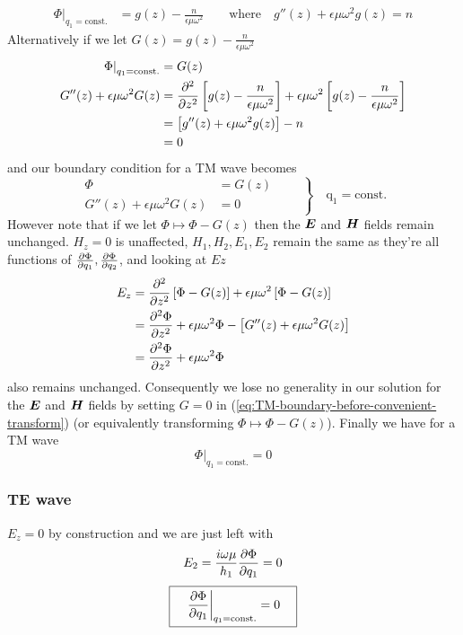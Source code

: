 \documentclass[twoside, a4paper]{article}
\begin{document}
\begin{align*}
\left. \Phi \right|_{q_1 = \mathrm{const.}} & = g(z) - \frac{n}{\epsilon \mu \omega^2}
\quad \quad \mathrm{where} \quad
g''(z) + \epsilon \mu \omega^2 g(z) = n
\end{align*}
Alternatively if we let $G(z) = g(z) - \frac{n}{\epsilon \mu \omega^2}$
\begin{align*}
\left. \Phi \right|_{q_1 = \mathrm{const.}} & = G(z) \\
G''(z) + \epsilon \mu \omega^2 G(z) & = 
\frac{\partial^2 }{\partial z^2}
		\left[ g(z) - \frac{n}{\epsilon \mu \omega^2} \right]
+ \epsilon \mu \omega^2 
		\left[ g(z) - \frac{n}{\epsilon \mu \omega^2} \right] \\
& = \left[ g''(z) + \epsilon \mu \omega^2 g(z) \right] - n \\
& = 0
\end{align*}
and our boundary condition for a TM wave becomes
\begin{equation}
\label{eq:TM-boundary-before-convenient-transform}
\left.
\begin{split}
\Phi  & = G(z) \\
G''(z) + \epsilon \mu \omega^2 G(z) & = 0
\end{split}
\quad \quad \right\} \quad \mathrm{q_1 = const.}
\end{equation}
However note that if we let $\Phi \mapsto \Phi - G(z)$ then the $\mbox{\boldmath$ E $}$ and $\mbox{\boldmath$ H $}$ fields remain unchanged. $H_z=0$ is unaffected, $H_1, H_2, E_1, E_2$ remain the same as they're all functions of $\frac{\partial \Phi}{\partial q_1}, \frac{\partial \Phi}{\partial q_2}$, and looking at $Ez$
\begin{align*}
E_z & = \frac{\partial^2 }{\partial z^2} \left[ \Phi - G(z) \right] + \epsilon \mu \omega^2 \left[ \Phi - G(z) \right] \\
& = \frac{\partial^2 \Phi}{\partial z^2} + \epsilon \mu \omega^2 \Phi - \left[ G''(z) + \epsilon \mu \omega^2 G(z) \right] \\
& =  \frac{\partial^2 \Phi}{\partial z^2} + \epsilon \mu \omega^2 \Phi
\end{align*}
also remains unchanged. Consequently we lose no generality in our solution for the $\mbox{\boldmath$ E $}$ and $\mbox{\boldmath$ H $}$ fields by setting $G = 0$ in (\ref{eq:TM-boundary-before-convenient-transform}) (or equivalently transforming \mbox{$\Phi \mapsto \Phi - G(z)$}). Finally we have for a TM wave
\begin{equation}
\label{eq:TM-boundary-condition}
\boxed{
\quad
\left. \Phi \right|_{q_1 = \mathrm{const.}} = 0
\quad
}
\end{equation}

\subsubsection{TE wave} 
$E_z = 0$ by construction and we are just left with
\begin{equation*}
E_2 = \frac{i \omega \mu}{h_1} \frac{\partial \Phi}{\partial q_1} = 0
\end{equation*}
\begin{equation}
\label{eq:TE-boundary-condition}
\boxed{
\quad \left. \frac{\partial \Phi}{\partial q_1} \right|_{q_1 = \mathrm{const.}} = 0 \quad
}
\end{equation}
\end{document}
